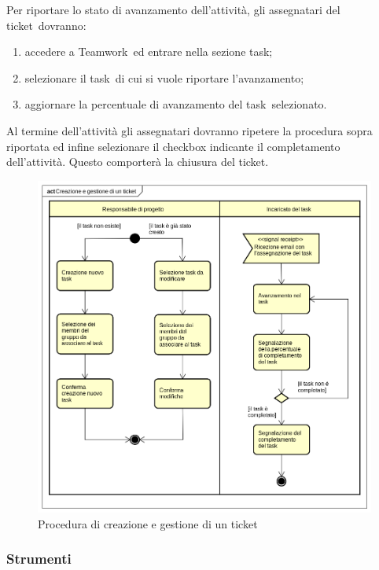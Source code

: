\documentclass[../NormeProgetto.tex]{subfiles}
\begin{document}
				Per riportare lo stato di avanzamento dell'attività, gli assegnatari del ticket\g\ dovranno:
				\begin{enumerate}
					\item accedere a Teamwork\g\ ed entrare nella sezione task\g;
					\item selezionare il task\g\ di cui si vuole riportare l'avanzamento;
					\item aggiornare la percentuale di avanzamento del task\g\ selezionato.
				\end{enumerate}
				Al termine dell'attività gli assegnatari dovranno ripetere la procedura sopra riportata ed infine selezionare il checkbox indicante il completamento dell'attività. Questo comporterà la chiusura del ticket\g.
				\begin{figure}[H]
					\centering
					\includegraphics[scale=0.5, width=\textwidth]{sections/img/proceduraTicket.png}
					\caption{Procedura di creazione e gestione di un ticket}\label{fig:Procedura di creazione e gestione di un ticket} 
				\end{figure}
		\subsubsection{Strumenti}
\end{document}
